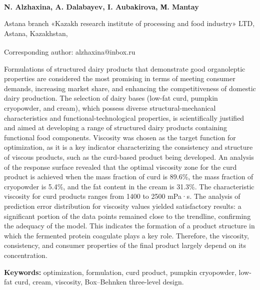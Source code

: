 \vspace{0.5em}
\begin{articleheader}

{\bfseries
N. Alzhaxina\textsuperscript{\envelope },
A. Dalabayev,
I. Aubakirova,
М. Mantay
}
\end{articleheader}

\begin{affiliation}
Astana branch «Kazakh research institute of processing and food industry» LTD, Astana, Kazakhstan,

\raggedright \textsuperscript{\envelope }Corresponding author: alzhaxina@inbox.ru
\end{affiliation}

Formulations of structured dairy products that demonstrate good
organoleptic properties are considered the most promising in terms of
meeting consumer demands, increasing market share, and enhancing the
competitiveness of domestic dairy production. The selection of dairy
bases (low-fat curd, pumpkin cryopowder, and cream), which possess
diverse structural-mechanical characteristics and
functional-tech\-nological properties, is scientifically justified and
aimed at developing a range of structured dairy products containing
functional food components. Viscosity was chosen as the target function
for optimization, as it is a key indicator characterizing the
consistency and structure of viscous products, such as the curd-based
product being developed. An analysis of the response surface revealed
that the optimal viscosity zone for the curd product is achieved when
the mass fraction of curd is 89.6\%, the mass fraction of cryopowder is
5.4\%, and the fat content in the cream is 31.3\%. The characteristic
viscosity for curd products ranges from 1400 to 2500 mPa·s. The analysis
of prediction error distribution for viscosity values yielded
satisfactory results: a significant portion of the data points remained
close to the trendline, confirming the adequacy of the model. This
indicates the formation of a product structure in which the fermented
protein coagulate plays a key role. Therefore, the viscosity,
consistency, and consumer properties of the final product largely depend
on its concentration.

{\bfseries Keywords:} optimization, formulation, curd product, pumpkin
cryopowder, low-fat curd, cream, visco\-sity, Box--Behnken three-level
design.

